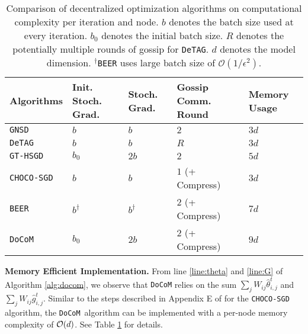 \documentclass[10pt]{article} %
\theoremstyle{plain}
\theoremstyle{definition}
\theoremstyle{remark}
\newcommand{\aname}{{\tt DoCoM}}
\newcommand{\redtmp}{}
\begin{document}
{\begin{table}[h]
\caption{\redtmp Comparison of decentralized optimization algorithms on computational complexity per iteration and node. $b$ denotes the batch size used at every iteration. $b_0$ denotes the initial batch size. $R$ denotes the potentially multiple rounds of gossip for {\tt DeTAG}. $d$ denotes the model dimension. $^\dagger${\tt BEER} uses large batch size of $\mathcal{O}(1/\epsilon^2)$.}
\label{tab:comp-compl}
\begin{center}
{\redtmp
\begin{tabular}{lllll}
\hline
\textbf{Algorithms} & \textbf{Init. Stoch. Grad.} & \textbf{Stoch. Grad.} & \textbf{Gossip Comm. Round} & \textbf{Memory Usage} \\ \hline
{\tt GNSD}      & $b$  & $b$  & $2$                 & $3d$ \\
{\tt DeTAG}     & $b$  & $b$  & $R$                 & $3d$ \\
{\tt GT-HSGD}   & $b_0$ & $2b$ & $2$                 & $5d$ \\
{\tt CHOCO-SGD} & $b$  & $b$  & $1$ (+ Compress) & $3d$ \\
{\tt BEER}     & $b^\dagger$ & $b^\dagger$ & $2$ (+ Compress) & $7d$ \\ %
{\tt DoCoM}     & $b_0$ & $2b$ & $2$ (+ Compress) & $9d$ \\ \hline
\end{tabular}}
\end{center}
\end{table}

\textbf{Memory Efficient Implementation.} From line \ref{line:theta} and \ref{line:G} of Algorithm \ref{alg:docom}, we observe that {\tt DoCoM} relies on the sum $\sum_j W_{ij} \widehat{\theta}_{i,j}^t$ and $\sum_j W_{ij} \widehat{g}_{i,j}^t$. Similar to the steps described in Appendix E of \citep{koloskova2019decentralized} for the {\tt CHOCO-SGD} algorithm, the {\aname}~algorithm can be implemented with a per-node memory complexity of ${\cal O}(d)$. See Table \ref{tab:comp-compl} for details.
}
\end{document}
